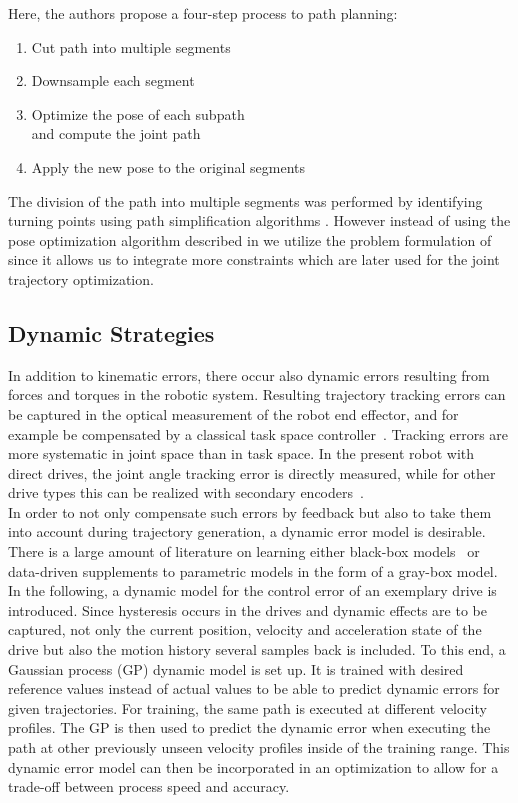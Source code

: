 \documentclass[5p,times,procedia]{elsarticle}
\begin{document}
Here, the authors propose a four-step process to path planning:
\begin{enumerate}
	\setlength\itemsep{-0.5em}
	\item Cut path into multiple segments
	\item Downsample each segment
	\item Optimize the pose of each subpath\\and compute the joint path
	\item Apply the new pose to the original segments
\end{enumerate}
The division of the path into multiple segments was performed by identifying turning points using path simplification algorithms \cite{stroke_division}.
However instead of using the pose optimization algorithm described in \cite{stroke_division} we utilize the problem formulation of \cite{previous_work} since it allows us to integrate more constraints which are later used for the joint trajectory optimization.
%
\subsection{Dynamic Strategies}\label{subsec:dynError}
In addition to kinematic errors, there occur also dynamic errors resulting from forces and torques in the robotic system.
Resulting trajectory tracking errors can be captured in the optical measurement of the robot end effector, and for example be compensated by a classical task space controller~\cite{Siciliano09}.
Tracking errors are more systematic in joint space than in task space.
In the present robot with direct drives, the joint angle tracking error is directly measured, while for other drive types this can be realized with secondary encoders~\cite{Mesmer22}.\\
In order to not only compensate such errors by feedback but also to take them into account during trajectory generation, a dynamic error model is desirable.
There is a large amount of literature on learning either black-box models~\cite{NguyenTuong08b} or data-driven supplements to parametric models in the form of a gray-box model.
In the following, a dynamic model for the control error of an exemplary drive is introduced.
Since hysteresis occurs in the drives and dynamic effects are to be captured, not only the current position, velocity and acceleration state of the drive but also the motion history several samples back is included. 
To this end, a Gaussian process (GP) dynamic model is set up.
It is trained with desired reference values instead of actual values to be able to predict dynamic errors for given trajectories.
For training, the same path is executed at different velocity profiles. 
The GP is then used to predict the dynamic error when executing the path at other previously unseen velocity profiles inside of the training range.
This dynamic error model can then be incorporated in an optimization to allow for a trade-off between process speed and accuracy.
%
\end{document}
